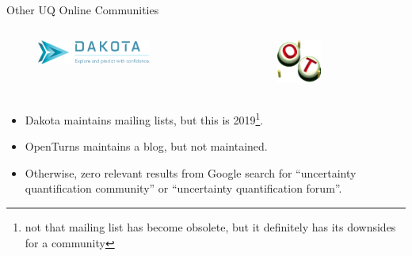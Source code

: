 \documentclass[]{rsuqbeamernew}
\begin{document}
\begin{frame}[t]{Other UQ Online Communities}

\begin{columns}
  \begin{figure}
    \includegraphics[width=0.70\textwidth]{../figures/dakota}
  \end{figure}
  
  \begin{figure}
    \includegraphics[width=0.45\textwidth]{../figures/openTurns}
  \end{figure}
\end{columns}

\begin{itemize}
  \item Dakota maintains mailing lists,
        but this is 2019\footnote{not that mailing list has become obsolete, but it definitely has its downsides for a community}.
  \item OpenTurns maintains a blog, but not maintained.
  \item Otherwise, zero relevant results from Google search
        for ``uncertainty quantification community'' or ``uncertainty quantification forum''.
\end{itemize}

\end{frame}
\end{document}
